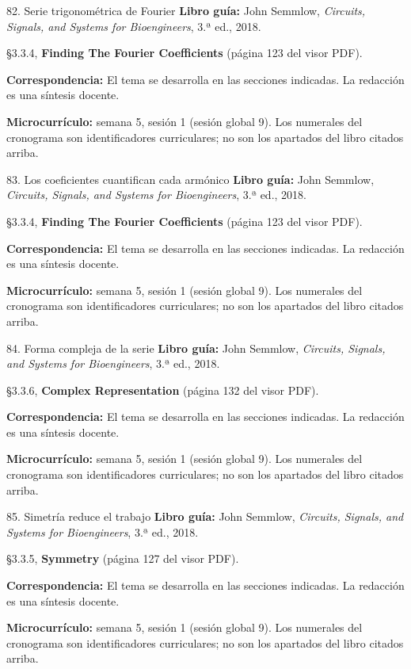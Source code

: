 \documentclass[
  10pt,
  ignorenonframetext,
  aspectratio=169,
  spanish,
]{beamer}
\begin{document}
\begin{frame}{82. Serie trigonométrica de Fourier}
\label{serie-trigonomuxe9trica-de-fourier}
\textbf{Libro guía:} John Semmlow, \emph{Circuits, Signals, and Systems
for Bioengineers}, 3.ª ed., 2018.

§3.3.4, \textbf{Finding The Fourier Coefficients} (página 123 del visor
PDF).

\textbf{Correspondencia:} El tema se desarrolla en las secciones
indicadas. La redacción es una síntesis docente.

\textbf{Microcurrículo:} semana 5, sesión 1 (sesión global 9). Los
numerales del cronograma son identificadores curriculares; no son los
apartados del libro citados arriba.
\end{frame}

\begin{frame}{83. Los coeficientes cuantifican cada armónico}
\label{los-coeficientes-cuantifican-cada-armuxf3nico}
\textbf{Libro guía:} John Semmlow, \emph{Circuits, Signals, and Systems
for Bioengineers}, 3.ª ed., 2018.

§3.3.4, \textbf{Finding The Fourier Coefficients} (página 123 del visor
PDF).

\textbf{Correspondencia:} El tema se desarrolla en las secciones
indicadas. La redacción es una síntesis docente.

\textbf{Microcurrículo:} semana 5, sesión 1 (sesión global 9). Los
numerales del cronograma son identificadores curriculares; no son los
apartados del libro citados arriba.
\end{frame}

\begin{frame}{84. Forma compleja de la serie}
\label{forma-compleja-de-la-serie}
\textbf{Libro guía:} John Semmlow, \emph{Circuits, Signals, and Systems
for Bioengineers}, 3.ª ed., 2018.

§3.3.6, \textbf{Complex Representation} (página 132 del visor PDF).

\textbf{Correspondencia:} El tema se desarrolla en las secciones
indicadas. La redacción es una síntesis docente.

\textbf{Microcurrículo:} semana 5, sesión 1 (sesión global 9). Los
numerales del cronograma son identificadores curriculares; no son los
apartados del libro citados arriba.
\end{frame}

\begin{frame}{85. Simetría reduce el trabajo}
\label{simetruxeda-reduce-el-trabajo}
\textbf{Libro guía:} John Semmlow, \emph{Circuits, Signals, and Systems
for Bioengineers}, 3.ª ed., 2018.

§3.3.5, \textbf{Symmetry} (página 127 del visor PDF).

\textbf{Correspondencia:} El tema se desarrolla en las secciones
indicadas. La redacción es una síntesis docente.

\textbf{Microcurrículo:} semana 5, sesión 1 (sesión global 9). Los
numerales del cronograma son identificadores curriculares; no son los
apartados del libro citados arriba.
\end{frame}
\end{document}

